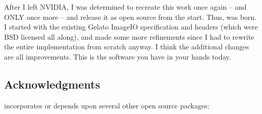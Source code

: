 After I left NVIDIA, I was determined to recreate this work once
again -- and ONLY once more -- and release it as open source from the
start.  Thus, \product was born.  I started with the existing Gelato
ImageIO specification and headers (which were BSD licensed all along),
and made some more refinements since I had to rewrite the entire
implementation from scratch anyway.  I think the additional changes are
all improvements.  This is the software you have in your hands today.


\subsection*{Acknowledgments}

\begin{comment}
The direct precursor to \product was Gelato's ImageIO, which was
co-designed and implemented by Larry Gritz, Dan Wexler, Jonathan Rice, Eric
Enderton, and Philip Nemec.

Big thanks to our bosses at NVIDIA for allowing us to share the API spec
and headers under the BSD license.  And thanks to their inability to
open source their own implementation in a timely manner, I was forced to
create this clearly superior descendant.
\end{comment}

\product incorporates or depends upon several other open source
packages:

